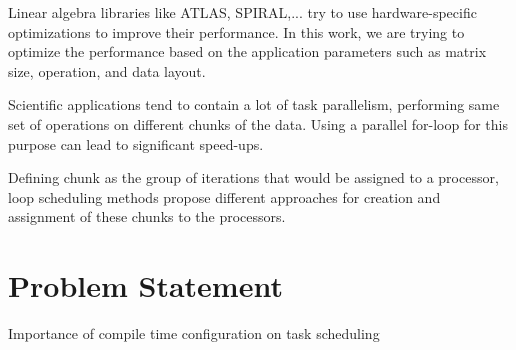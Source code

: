 Linear algebra libraries like ATLAS, SPIRAL,... try to use hardware-specific optimizations to improve their performance. In this work, we are trying to optimize the performance based on the application parameters such as matrix size, operation, and data layout.   

Scientific applications tend to contain a lot of task parallelism, performing same set of operations on different chunks of the data. Using a parallel for-loop for this purpose can lead to significant speed-ups.

Defining chunk as the group of iterations that would be assigned to a
processor, loop scheduling methods propose different approaches for creation and assignment of these chunks to the processors.




\vspace{\baselineskip}
\section{Problem Statement}
Importance of compile time configuration on task scheduling


\vspace{\baselineskip}
